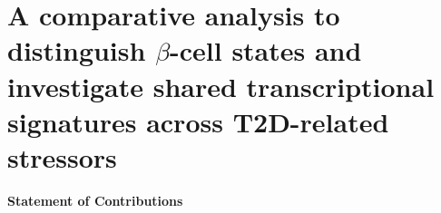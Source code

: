 
\chapter{A comparative analysis to distinguish $\beta$-cell states and investigate shared transcriptional signatures across T2D-related stressors
}
\label{chp:meta_analysis}

\newpage\null\thispagestyle{empty}\newpage

\begin{Abstract}
    
\end{Abstract}


\clearpage

\begin{Comment2}
\vspace{3mm}
\label{contr:chapter2}
\hspace{-3mm}
\textbf{Statement of Contributions} \\\\

\end{Comment2}




